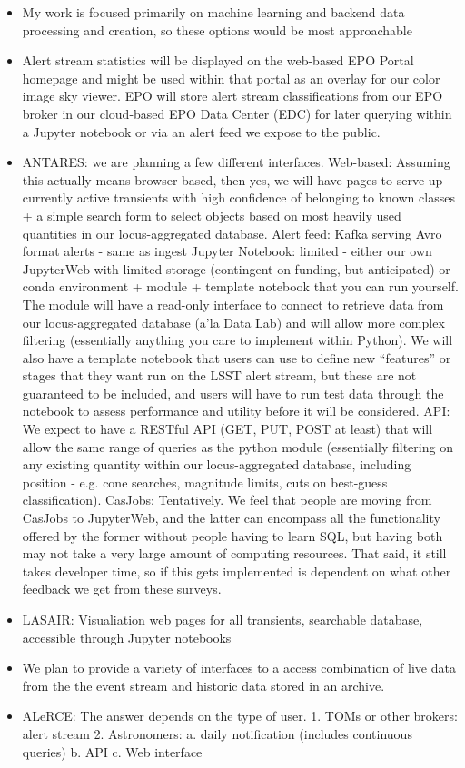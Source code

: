 \documentclass{article}
\begin{document}
\begin{itemize}
\item My work is focused primarily on machine learning and backend data processing and creation, so these options would be most approachable
\item Alert stream statistics will be displayed on the web-based EPO Portal homepage and might be used within that portal as an overlay for our color image sky viewer.  EPO will store alert stream classifications from our EPO broker in our cloud-based EPO Data Center (EDC) for later querying within a Jupyter notebook or via an alert feed we expose to the public.
\item ANTARES: we are planning a few different interfaces. Web-based: Assuming this actually means browser-based, then yes, we will have pages to serve up currently active transients with high confidence of belonging to known classes + a simple search form to select objects based on most heavily used quantities in our locus-aggregated database.  Alert feed: Kafka serving Avro format alerts - same as ingest  Jupyter Notebook: limited - either our own JupyterWeb with limited storage (contingent on funding, but anticipated) or conda environment + module + template notebook that you can run yourself. The module will have a read-only interface to connect to retrieve data from our locus-aggregated database (a’la Data Lab) and will allow more complex filtering (essentially anything you care to implement within Python). We will also have a template notebook that users can use to define new “features” or stages that they want run on the LSST alert stream, but these are not guaranteed to be included, and users will have to run test data through the notebook to assess performance and utility before it will be considered.   API: We expect to have a RESTful API (GET, PUT, POST at least) that will allow the same range of queries as the python module (essentially filtering on any existing quantity within our locus-aggregated database, including position - e.g. cone searches, magnitude limits, cuts on best-guess classification).    CasJobs: Tentatively. We feel that people are moving from CasJobs to JupyterWeb, and the latter can encompass all the functionality offered by the former without people having to learn SQL, but having both may not take a very large amount of computing resources. That said, it still takes developer time, so if this gets implemented is dependent on what other feedback we get from these surveys.
\item LASAIR: Visualiation web pages for all transients, searchable database, accessible through Jupyter notebooks 
\item We plan to provide a variety of interfaces to a access combination of live data from the the event stream and historic data stored in an archive.
\item ALeRCE: The answer depends on the type of user. 1. TOMs or other brokers: alert stream 2. Astronomers: a. daily notification (includes continuous queries) b. API c. Web interface
\end{itemize}
\end{document}
